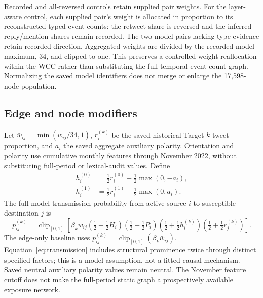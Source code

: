 \documentclass[11pt,a4paper]{article}
\begin{document}
Recorded and all-reversed controls retain supplied pair weights. For the layer-aware control, each supplied pair's weight is allocated in proportion to its reconstructed typed-event counts: the retweet share is reversed and the inferred-reply/mention shares remain recorded. The two model pairs lacking type evidence retain recorded direction. Aggregated weights are divided by the recorded model maximum, 34, and clipped to one. This preserves a controlled weight reallocation within the WCC rather than substituting the full temporal event-count graph. Normalizing the saved model identifiers does not merge or enlarge the 17,598-node population.

\subsection{Edge and node modifiers}
Let $\bar w_{ij}=\min(w_{ij}/34,1)$, $r_i^{(k)}$ be the saved historical Target-$k$ tweet proportion, and $a_i$ the saved aggregate auxiliary polarity. Orientation and polarity use cumulative monthly features through November 2022, without substituting full-period or lexical-audit values. Define
\begin{align}
h_i^{(0)}&=\tfrac12 r_i^{(0)}+\tfrac12\max(0,-a_i),\\
h_i^{(1)}&=\tfrac12 r_i^{(1)}+\tfrac12\max(0,a_i).
\end{align}
The full-model transmission probability from active source $i$ to susceptible destination $j$ is
\begin{equation}\label{eq:transmission}
p_{ij}^{(k)}=\operatorname{clip}_{[0,1]}\!\left[
\beta_k\bar w_{ij}
\left(\tfrac12+\tfrac12H_i\right)
\left(\tfrac12+\tfrac12P_i\right)
\left(\tfrac12+\tfrac12h_i^{(k)}\right)
\left(\tfrac12+\tfrac12r_j^{(k)}\right)\right].
\end{equation}
The edge-only baseline uses $p_{ij}^{(k)}=\operatorname{clip}_{[0,1]}(\beta_k\bar w_{ij})$. Equation~\ref{eq:transmission} includes structural prominence twice through distinct specified factors; this is a model assumption, not a fitted causal mechanism. Saved neutral auxiliary polarity values remain neutral. The November feature cutoff does not make the full-period static graph a prospectively available exposure network.
\end{document}
